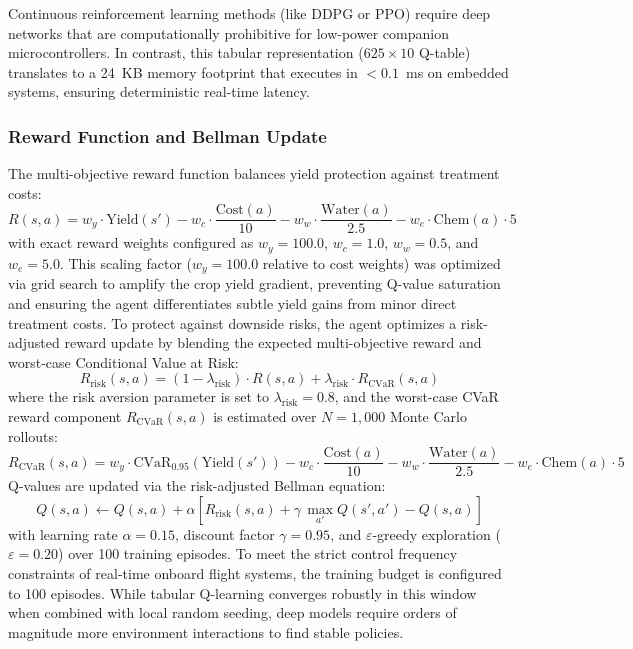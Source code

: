 \documentclass[review,3p,times,authoryear]{elsarticle}
\begin{document}
Continuous reinforcement learning methods (like DDPG or PPO) require deep networks that are computationally prohibitive for low-power companion microcontrollers. In contrast, this tabular representation ($625 \times 10$ Q-table) translates to a 24~KB memory footprint that executes in $<0.1$~ms on embedded systems, ensuring deterministic real-time latency.

\subsubsection{Reward Function and Bellman Update}
The multi-objective reward function balances yield protection against treatment costs:
\begin{equation}
R(s,a) = w_y \cdot \text{Yield}(s') - w_c \cdot \frac{\text{Cost}(a)}{10} - w_w \cdot \frac{\text{Water}(a)}{2.5} - w_e \cdot \text{Chem}(a) \cdot 5
\end{equation}
with exact reward weights configured as $w_y = 100.0$, $w_c = 1.0$, $w_w = 0.5$, and $w_e = 5.0$. This scaling factor ($w_y = 100.0$ relative to cost weights) was optimized via grid search to amplify the crop yield gradient, preventing Q-value saturation and ensuring the agent differentiates subtle yield gains from minor direct treatment costs. To protect against downside risks, the agent optimizes a risk-adjusted reward update by blending the expected multi-objective reward and worst-case Conditional Value at Risk:
\begin{equation}
R_\text{risk}(s,a) = (1 - \lambda_\text{risk}) \cdot R(s,a) + \lambda_\text{risk} \cdot R_\text{CVaR}(s,a)
\end{equation}
where the risk aversion parameter is set to $\lambda_\text{risk} = 0.8$, and the worst-case CVaR reward component $R_\text{CVaR}(s,a)$ is estimated over $N=1,000$ Monte Carlo rollouts:
\begin{equation}
R_\text{CVaR}(s,a) = w_y \cdot \text{CVaR}_{0.95}(\text{Yield}(s')) - w_c \cdot \frac{\text{Cost}(a)}{10} - w_w \cdot \frac{\text{Water}(a)}{2.5} - w_e \cdot \text{Chem}(a) \cdot 5
\end{equation}
Q-values are updated via the risk-adjusted Bellman equation:
\begin{equation}
Q(s,a) \leftarrow Q(s,a) + \alpha\!\left[R_\text{risk}(s,a) + \gamma\,\max_{a'}Q(s',a') - Q(s,a)\right]
\end{equation}
with learning rate $\alpha = 0.15$, discount factor $\gamma = 0.95$, and $\varepsilon$-greedy exploration ($\varepsilon = 0.20$) over 100 training episodes. To meet the strict control frequency constraints of real-time onboard flight systems, the training budget is configured to 100 episodes. While tabular Q-learning converges robustly in this window when combined with local random seeding, deep models require orders of magnitude more environment interactions to find stable policies.
\end{document}

